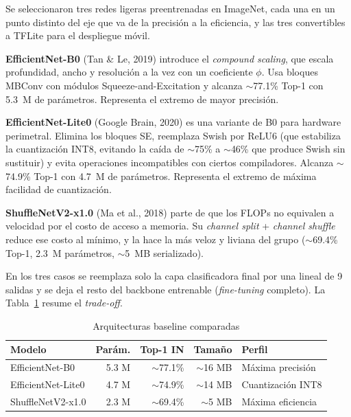 \documentclass[12pt,letterpaper]{article}
\begin{document}
Se seleccionaron tres redes ligeras preentrenadas en ImageNet, cada una en un punto distinto del eje que va de la precisi\'on a la eficiencia, y las tres convertibles a TFLite para el despliegue m\'ovil.

\textbf{EfficientNet-B0} (Tan \& Le, 2019) introduce el \textit{compound scaling}, que escala profundidad, ancho y resoluci\'on a la vez con un coeficiente $\phi$. Usa bloques MBConv con m\'odulos Squeeze-and-Excitation y alcanza $\sim$77.1\% Top-1 con 5.3~M de par\'ametros. Representa el extremo de mayor precisi\'on.

\textbf{EfficientNet-Lite0} (Google Brain, 2020) es una variante de B0 para hardware perimetral. Elimina los bloques SE, reemplaza Swish por ReLU6 (que estabiliza la cuantizaci\'on INT8, evitando la ca\'ida de $\sim$75\% a $\sim$46\% que produce Swish sin sustituir) y evita operaciones incompatibles con ciertos compiladores. Alcanza $\sim$74.9\% Top-1 con 4.7~M de par\'ametros. Representa el extremo de m\'axima facilidad de cuantizaci\'on.

\textbf{ShuffleNetV2-x1.0} (Ma et al., 2018) parte de que los FLOPs no equivalen a velocidad por el costo de acceso a memoria. Su \textit{channel split} + \textit{channel shuffle} reduce ese costo al m\'inimo, y la hace la m\'as veloz y liviana del grupo ($\sim$69.4\% Top-1, 2.3~M par\'ametros, $\sim$5~MB serializado).

En los tres casos se reemplaza solo la capa clasificadora final por una lineal de 9 salidas y se deja el resto del backbone entrenable (\textit{fine-tuning} completo). La Tabla~\ref{tab:models} resume el \textit{trade-off}.

\begin{table}[H]
\caption{Arquitecturas baseline comparadas}
\label{tab:models}
\centering
\small
\begin{singlespace}
\begin{tabular}{lrrrl}
\toprule
\textbf{Modelo} & \textbf{Par\'am.} & \textbf{Top-1 IN} & \textbf{Tama\~no} & \textbf{Perfil} \\
\midrule
EfficientNet-B0 & 5.3 M & $\sim$77.1\% & $\sim$16 MB & M\'axima precisi\'on \\
EfficientNet-Lite0 & 4.7 M & $\sim$74.9\% & $\sim$14 MB & Cuantizaci\'on INT8 \\
ShuffleNetV2-x1.0 & 2.3 M & $\sim$69.4\% & $\sim$5 MB & M\'axima eficiencia \\
\bottomrule
\end{tabular}
\end{singlespace}
\end{table}
\end{document}
